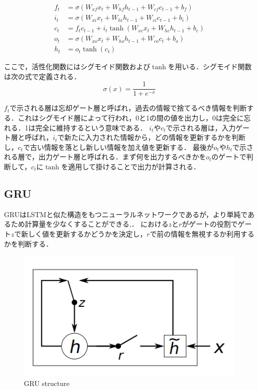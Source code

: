 \begin{align}\label{eq:LSTM}
	f_t & = \sigma(W_{xf} x_t + W_{hf} h_{t-1} + W_{cf} c_{t-1} + b_f ) \\
	i_t & = \sigma(W_{xi} x_t + W_{hi} h_{t-1} + W_{ci} c_{t-1} + b_i) \\
	c_t & = f_t c_{t-1} + i_t \tanh(W_{xc} x_t + W_{hc} h_{t-1} + b_c) \\
	o_t & = \sigma(W_{xo} x_t + W_{ho} h_{t-1} + W_{co} c_t + b_o) \\
	h_t & = o_t \tanh(c_t) 
\end{align}

ここで，活性化関数にはシグモイド関数および$\tanh$を用いる．シグモイド関数は次の式で定義される．
\begin{equation}\label{eq:sigmoid}
	\sigma (x) = \dfrac{1}{1 + e^{-x}}
\end{equation}

$f_t$で示される層は忘却ゲート層と呼ばれ，過去の情報で捨てるべき情報を判断する．これはシグモイド層によって行われ，0と1の間の値を出力し，0は完全に忘れる．1は完全に維持するという意味である．
$i_t$や$c_t$で示される層は，入力ゲート層と呼ばれ，$i_t$で新たに入力された情報から，どの情報を更新するかを判断し，$c_t$で古い情報を落とし新しい情報を加え値を更新する．
最後が$o_t$や$h_t$で示される層で，出力ゲート層と呼ばれる．まず何を出力するべきかを$o_t$のゲートで判断して，$c_t$に$\tanh$を適用して掛けることで出力が計算される．

\subsection*{GRU}
GRUはLSTMと似た構造をもつニューラルネットワークであるが，より単純であるため計算量を少なくすることができる,\cite{cho2014learning}．
における$z$と$r$がゲートの役割でゲート$z$で新しく値を更新するかどうかを決定し，$r$で前の情報を無視するか利用するかを判断する．

\begin{figure}[H]
	\centering
	\includegraphics[width=0.7\linewidth]{fig/chapter2/gru}
	\caption{GRU structure}
	\label{fig:gru}
\end{figure}



